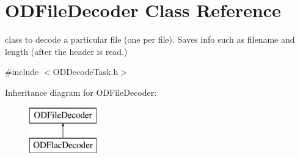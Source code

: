 \hypertarget{class_o_d_file_decoder}{}\section{O\+D\+File\+Decoder Class Reference}
\label{class_o_d_file_decoder}


class to decode a particular file (one per file). Saves info such as filename and length (after the header is read.)  




{\ttfamily \#include $<$O\+D\+Decode\+Task.\+h$>$}

Inheritance diagram for O\+D\+File\+Decoder\+:\begin{figure}[H]
\begin{center}
\leavevmode
\includegraphics[height=2.000000cm]{class_o_d_file_decoder}
\end{center}
\end{figure}
